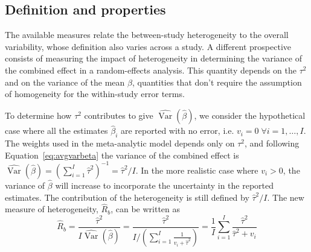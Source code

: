 \documentclass[11pt,a4paper,twoside,openany]{book}\usepackage{knitr}
\DeclareMathOperator{\Var}{Var}
\begin{document}
{\subsection{Definition and properties}

The available measures relate the between-study heterogeneity to the overall variability, whose definition also varies across a study. A different prospective consists of measuring the impact of heterogeneity in determining the variance of the combined effect in a random-effects analysis. This quantity depends on the $\tau^2$ and on the variance of the mean $\hat \beta$, quantities that don't require the assumption of homogeneity for the within-study error terms.

To determine how $\tau^2$ contributes to give $\widehat{\Var} \left(\hat \beta \right)$, we consider the hypothetical case where all the estimates $\hat \beta_i$ are reported with no error, i.e. $v_i = 0 \; \forall i = 1, \dots, I$. The weights used in the meta-analytic model depends only on $\tau^2$, and following Equation~\ref{eq:avgvarbeta} the variance of the combined effect is $\widehat{\Var} \left(\hat \beta \right) = \left(\sum_{i = 1}^I \hat \tau^2 \right)^{-1} = \hat \tau^2/I$.
In the more realistic case where $v_i > 0$, the variance of $\hat \beta$ will increase to incorporate the uncertainty in the reported estimates. The contribution of the heterogeneity is still defined by $\hat \tau^2/I$. The new measure of heterogeneity, $\hat R_b$, can be written as
\begin{equation}
\hat R_b = \frac{\hat \tau^2}{I \widehat{\Var} \left(\hat \beta \right)} = \frac{\hat \tau^2}{I/\left( \sum_{i = 1}^I \frac{1}{v_i + \hat \tau^2} \right)} = \frac{1}{I}\sum_{i = 1}^I \frac{\hat \tau^2}{\hat \tau^2 + v_i}
\label{eq:Rb}
\end{equation}

}
\end{document}
